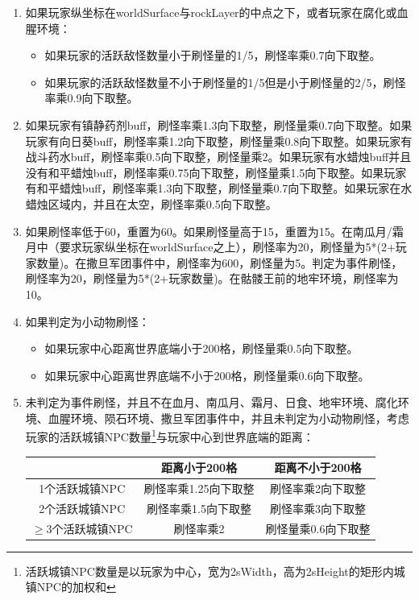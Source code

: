 \begin{enumerate}
    \item 如果玩家纵坐标在worldSurface与rockLayer的中点之下，或者玩家在腐化或血腥环境：\begin{itemize}
        \item 如果玩家的活跃敌怪数量小于刷怪量的1/5，刷怪率乘0.7向下取整。
        \item 如果玩家的活跃敌怪数量不小于刷怪量的1/5但是小于刷怪量的2/5，刷怪率乘0.9向下取整。
    \end{itemize}
    \item 如果玩家有镇静药剂buff，刷怪率乘1.3向下取整，刷怪量乘0.7向下取整。如果玩家有向日葵buff，刷怪率乘1.2向下取整，刷怪量乘0.8向下取整。如果玩家有战斗药水buff，刷怪率乘0.5向下取整，刷怪量乘2。如果玩家有水蜡烛buff并且没有和平蜡烛buff，刷怪率乘0.75向下取整，刷怪量乘1.5向下取整。如果玩家有和平蜡烛buff，刷怪率乘1.3向下取整，刷怪量乘0.7向下取整。如果玩家在水蜡烛区域内，并且在太空，刷怪率乘0.5向下取整。
    \item 如果刷怪率低于60，重置为60。如果刷怪量高于15，重置为15。在南瓜月/霜月中（要求玩家纵坐标在worldSurface之上），刷怪率为20，刷怪量为5*(2+玩家数量)。在撒旦军团事件中，刷怪率为600，刷怪量为5。判定为事件刷怪，刷怪率为20，刷怪量为5*(2+玩家数量)。在骷髅王前的地牢环境，刷怪率为10。
    \item 如果判定为小动物刷怪：\begin{itemize}
        \item 如果玩家中心距离世界底端小于200格，刷怪量乘0.5向下取整。
        \item 如果玩家中心距离世界底端不小于200格，刷怪量乘0.6向下取整。
    \end{itemize}
    \item 未判定为事件刷怪，并且不在血月、南瓜月、霜月、日食、地牢环境、腐化环境、血腥环境、陨石环境、撒旦军团事件中，并且未判定为小动物刷怪，考虑玩家的活跃城镇NPC数量\footnote{活跃城镇NPC数量是以玩家为中心，宽为2sWidth，高为2sHeight的矩形内城镇NPC的加权和}与玩家中心到世界底端的距离：\\
    \begin{tabular}{|c|c|c|}
        \hline
        &距离小于200格&距离不小于200格\\\hline
        1个活跃城镇NPC&刷怪率乘1.25向下取整&刷怪率乘2向下取整\\\hline
        2个活跃城镇NPC&刷怪率乘1.5向下取整&刷怪率乘3向下取整\\\hline
        $\ge$3个活跃城镇NPC&刷怪率乘2&刷怪量乘0.6向下取整\\\hline
    \end{tabular}
\end{enumerate}

